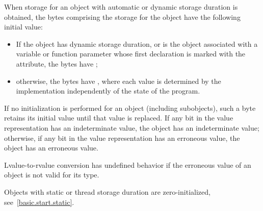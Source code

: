 \pnum
When storage for an object with automatic or dynamic storage duration
is obtained,
the bytes comprising the storage for the object
have the following initial value:
\begin{itemize}
\item
If the object has dynamic storage duration, or
is the object associated with a variable or function parameter
whose first declaration is marked with
the \tcode{[[indeterminate]]} attribute,
the bytes have ;
\item
otherwise, the bytes have ,
where each value is determined by the implementation
independently of the state of the program.
\end{itemize}
If no initialization is performed for an object (including subobjects),
such a byte retains its initial value
until that value is replaced.
If any bit in the value representation has an indeterminate value,
the object has an indeterminate value;
otherwise, if any bit in the value representation has an erroneous value,
the object has an erroneous value.
\begin{note}
Lvalue-to-rvalue conversion has undefined behavior
if the erroneous value of an object is not valid for its type.
\end{note}
\begin{note}
Objects with static or thread storage duration are zero-initialized,
see~\ref{basic.start.static}.
\end{note}

